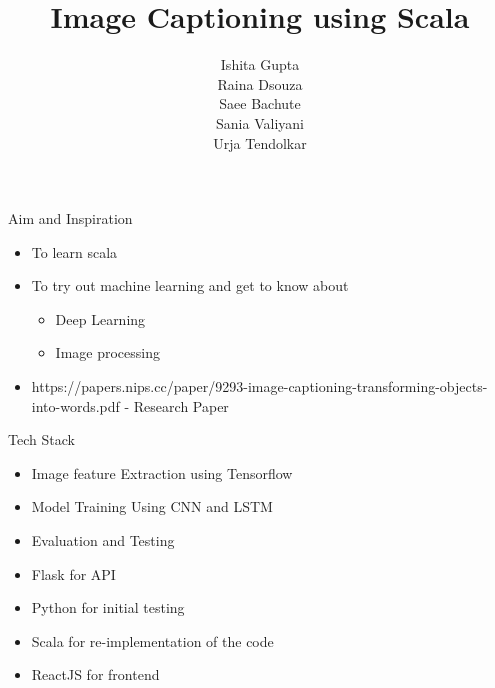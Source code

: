 \documentclass{beamer}
\title{Image Captioning using Scala}
\author{Ishita Gupta \\ Raina Dsouza \\ Saee Bachute \\ Sania Valiyani \\ Urja Tendolkar}
\date{}
\begin{document}
\begin{frame}
  \titlepage
\end{frame}


\begin{frame}{Aim and Inspiration}
   \begin{itemize}
       \item To learn scala
       \item To try out machine learning and get to know about
        \begin{itemize}
            \item Deep Learning
            \item Image processing
        \end{itemize}
       \item https://papers.nips.cc/paper/9293-image-captioning-transforming-objects-into-words.pdf - Research Paper
   \end{itemize}
\end{frame}


\begin{frame}{Tech Stack}
    \begin{itemize}
        \item Image feature Extraction using Tensorflow
        \item Model Training Using CNN and LSTM
        \item Evaluation and Testing
        \item Flask for API
        \item Python for initial testing
        \item Scala for re-implementation of the code
        \item ReactJS for frontend
    \end{itemize}
\end{frame}
\end{document}
